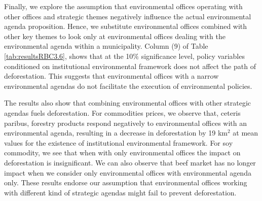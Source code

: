 Finally, we explore the assumption that environmental offices operating with other offices and strategic themes negatively influence the actual environmental agenda proposition. Hence, we substitute environmental offices combined with other key themes to look only at environmental offices dealing with the environmental agenda within a municipality. Column (9) of Table \ref{tab:resultsRBC3.6}, shows that at the 10$\%$ significance level, policy variables conditioned on institutional environmental framework does not affect the path of deforestation. This suggests that environmental offices with a narrow environmental agendas do not facilitate the execution of environmental policies. 


The results also show that combining environmental offices with other strategic agendas fuels deforestation. For commodities prices, we observe that, ceteris paribus, forestry products respond negatively to environmental offices with an environmental agenda, resulting in a decrease in deforestation by 19 km$^{2}$ at mean values for the existence of institutional environmental framework. For soy commodity, we see that when with only environmental offices the impact on deforestation is insignificant. We can also observe that beef market has no longer impact when we consider only environmental offices with environmental agenda only. These results endorse our assumption that environmental offices working with different kind of strategic agendas might fail to prevent deforestation.

